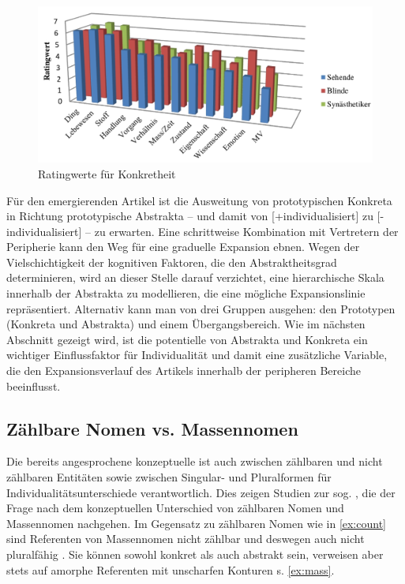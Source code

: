 \begin{figure}
\begin{center}
\includegraphics[width=12cm]{images/rating-konkret-abstrakt-schrauf-neu.jpg}
\caption {Ratingwerte für Konkretheit \parencite[][162]{Schrauf2011}}
\label{abb:schrauf-rating}
\end{center}
\end{figure}

Für den emergierenden Artikel ist die Ausweitung von prototypischen Konkreta in Richtung prototypische Abstrakta -- und damit von [+individualisiert] zu [-individualisiert] -- zu erwarten. Eine schrittweise Kombination mit Vertretern der Peripherie kann den Weg für eine graduelle Expansion ebnen. Wegen der Vielschichtigkeit der kognitiven Faktoren, die den Abstraktheitsgrad determinieren, wird an dieser Stelle darauf verzichtet, eine hierarchische Skala innerhalb der  Abstrakta zu modellieren, die eine mögliche Expansionslinie repräsentiert. Alternativ kann man von drei Gruppen ausgehen: den Prototypen (Konkreta und Abstrakta) und einem Übergangsbereich. Wie im nächsten Abschnitt gezeigt wird, ist die potentielle  von Abstrakta und Konkreta ein wichtiger Einflussfaktor für Individualität und damit eine zusätzliche Variable, die den Expansionsverlauf des Artikels innerhalb der peripheren Bereiche beeinflusst.  

\subsection{Zählbare Nomen vs. Massennomen}\label{section:mass}

Die bereits angesprochene konzeptuelle  ist auch zwischen zählbaren und nicht zählbaren Entitäten sowie zwischen Singular- und Pluralformen für Individualitätsunterschiede verantwortlich. Dies zeigen Studien zur sog.  \parencite[s.][]{Jackendoff1991, Langacker1991, Bisle-Muller1991, Rijkhoff1991,Rijkhoff2002, Corbett2000, Massam2012,Zifonun2012}, die der Frage nach dem konzeptuellen Unterschied von zählbaren Nomen und Massennomen nachgehen. Im Gegensatz zu zählbaren Nomen wie in \ref{ex:count} sind Referenten von Massennomen nicht zählbar und deswegen auch nicht pluralfähig \parencite[77]{Langacker1991}. Sie können sowohl konkret als auch abstrakt sein, verweisen aber stets auf amorphe Referenten mit unscharfen Konturen s. \ref{ex:mass}. 

